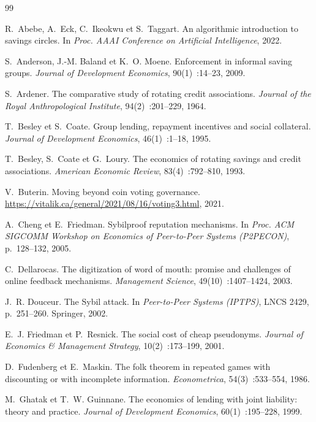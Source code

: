 \documentclass[11pt,a4paper]{article}
\theoremstyle{plain}
\theoremstyle{definition}
\theoremstyle{remark}
\newcommand{\1}{\mathbf{1}}
\begin{document}
\begin{thebibliography}{99}
\small

R.~Abebe, A.~Eck, C.~Ikeokwu et S.~Taggart.
An algorithmic introduction to savings circles.
In \emph{Proc. AAAI Conference on Artificial Intelligence}, 2022.

S.~Anderson, J.-M. Baland et K.~O. Moene.
Enforcement in informal saving groups.
\emph{Journal of Development Economics}, 90(1)~:14--23, 2009.

S.~Ardener.
The comparative study of rotating credit associations.
\emph{Journal of the Royal Anthropological Institute}, 94(2)~:201--229, 1964.

T.~Besley et S.~Coate.
Group lending, repayment incentives and social collateral.
\emph{Journal of Development Economics}, 46(1)~:1--18, 1995.

T.~Besley, S.~Coate et G.~Loury.
The economics of rotating savings and credit associations.
\emph{American Economic Review}, 83(4)~:792--810, 1993.

V.~Buterin.
Moving beyond coin voting governance.
\url{https://vitalik.ca/general/2021/08/16/voting3.html}, 2021.

A.~Cheng et E.~Friedman.
Sybilproof reputation mechanisms.
In \emph{Proc. ACM SIGCOMM Workshop on Economics of Peer-to-Peer Systems
(P2PECON)}, p.~128--132, 2005.

C.~Dellarocas.
The digitization of word of mouth: promise and challenges of online feedback
mechanisms.
\emph{Management Science}, 49(10)~:1407--1424, 2003.

J.~R. Douceur.
The Sybil attack.
In \emph{Peer-to-Peer Systems (IPTPS)}, LNCS 2429, p.~251--260. Springer, 2002.

E.~J. Friedman et P.~Resnick.
The social cost of cheap pseudonyms.
\emph{Journal of Economics \& Management Strategy}, 10(2)~:173--199, 2001.

D.~Fudenberg et E.~Maskin.
The folk theorem in repeated games with discounting or with incomplete
information.
\emph{Econometrica}, 54(3)~:533--554, 1986.

M.~Ghatak et T.~W. Guinnane.
The economics of lending with joint liability: theory and practice.
\emph{Journal of Development Economics}, 60(1)~:195--228, 1999.


\end{thebibliography}
\end{document}
